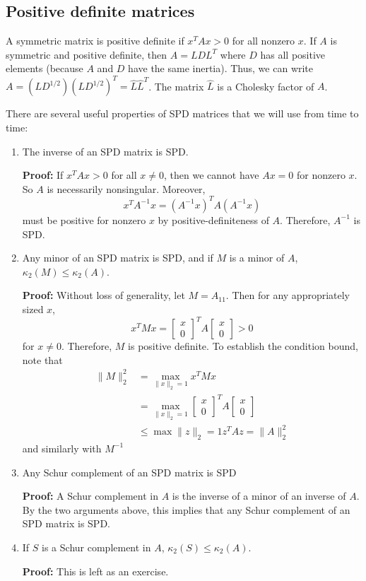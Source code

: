 \subsection{Positive definite matrices}

A symmetric matrix is positive definite if $x^T A x > 0$ for all
nonzero $x$.  If $A$ is symmetric and positive definite, then $A =
LDL^T$ where $D$ has all positive elements (because $A$ and $D$ have
the same inertia).  Thus, we can write $A = (LD^{1/2})(LD^{1/2})^T =
\hat{L} \hat{L}^T$.  The matrix $\hat{L}$ is a Cholesky factor of $A$.

There are several useful properties of SPD matrices that we will
use from time to time:
\begin{enumerate}
\item
  The inverse of an SPD matrix is SPD.

  {\bf Proof:}
  If $x^T A x > 0$ for all $x \neq 0$, then we cannot have $Ax = 0$
  for nonzero $x$.  So $A$ is necessarily nonsingular.  Moreover,
  \[
    x^T A^{-1} x = (A^{-1} x)^T A (A^{-1} x)
  \]
  must be positive for nonzero $x$ by positive-definiteness of $A$.
  Therefore, $A^{-1}$ is SPD.

\item
  Any minor of an SPD matrix is SPD, and if $M$ is a minor of $A$,
  $\kappa_2(M) \leq \kappa_2(A)$.

  {\bf Proof:}
  Without loss of generality, let $M = A_{11}$.  Then for any appropriately
  sized $x$,
  \[
    x^T M x = \begin{bmatrix} x \\ 0 \end{bmatrix}^T A \begin{bmatrix} x \\ 0 \end{bmatrix} > 0
  \]
  for $x \neq 0$.  Therefore, $M$ is positive definite.  To establish the
  condition bound, note that
  \begin{align*}
    \|M\|_2^2 &= \max_{\|x\|_2 = 1} x^T M x \\
              &= \max_{\|x\|_2 = 1} \begin{bmatrix} x \\ 0 \end{bmatrix}^T A \begin{bmatrix} x \\ 0 \end{bmatrix} \\
              & \leq \max{\|z\|_2 = 1} z^T A z = \|A\|_2^2
  \end{align*}
  and similarly with $M^{-1}$

\item
  Any Schur complement of an SPD matrix is SPD

  {\bf Proof:}
  A Schur complement in $A$ is the inverse of a minor of an inverse of $A$.
  By the two arguments above, this implies that any Schur complement of
  an SPD matrix is SPD.

\item If $S$ is a Schur complement in $A$, $\kappa_2(S) \leq \kappa_2(A)$.

  {\bf Proof:}  This is left as an exercise.
\end{enumerate}
